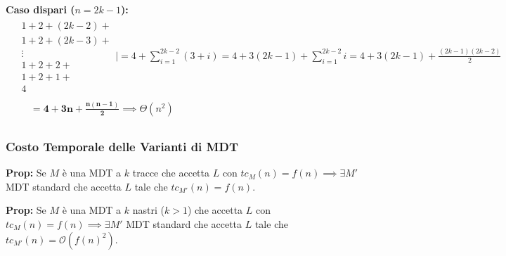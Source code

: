 \textbf{Caso dispari ($n = 2k-1$):}
\begin{align*}
    &\begin{array}{l}
        1 + 2 + (2k-2) + \\
        1 + 2 + (2k-3) + \\
        \vdots \\
        1 + 2 + 2 + \\
        1 + 2 + 1 + \\
        4
    \end{array}
    \Bigg| = 4 + \sum_{i=1}^{2k-2} (3+i) = 4 + 3(2k-1) + \sum_{i=1}^{2k-2} i = 4 + 3(2k-1) + \frac{(2k-1)(2k-2)}{2} \\
    &\phantom{\begin{array}{l} \vdots \\ 4 \end{array}} = \mathbf{4 + 3n + \frac{n(n-1)}{2}} \implies \Theta(n^2)
\end{align*}

\vspace{0.8cm}

\subsubsection*{Costo Temporale delle Varianti di MDT}

\textbf{Prop:} Se $M$ è una MDT a $k$ tracce che accetta $L$ con $tc_M(n) = f(n) \implies \exists M'$ MDT standard che accetta $L$ tale che $tc_{M'}(n) = f(n)$.

\vspace{0.4cm}
\textbf{Prop:} Se $M$ è una MDT a $k$ nastri ($k>1$) che accetta $L$ con $tc_M(n) = f(n) \implies \exists M'$ MDT standard che accetta $L$ tale che $tc_{M'}(n) = \mathcal{O}(f(n)^2)$.

